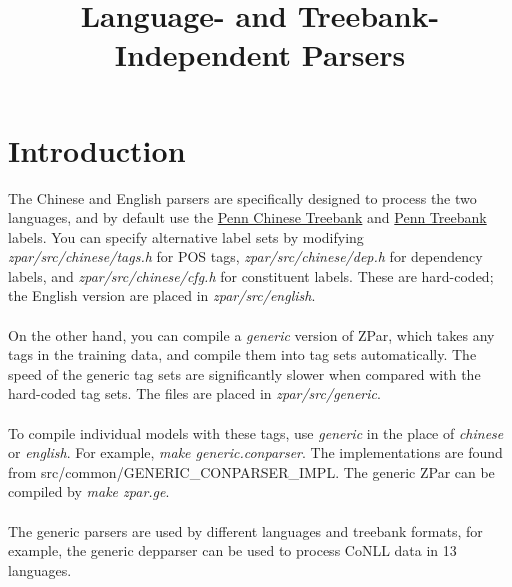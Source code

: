 \documentclass[12pt]{article}
\title{Language- and Treebank-Independent Parsers}
\begin{document}
\maketitle

\section{Introduction}
The Chinese and English parsers are specifically designed to process the two languages, and by default use the \href{http://www.cis.upenn.edu/~chinese/}{Penn Chinese Treebank} and \href{http://www.cis.upenn.edu/~treebank/}{Penn Treebank} labels. You can specify alternative label sets by modifying \textit{zpar/src/chinese/tags.h} for POS tags, \textit{zpar/src/chinese/dep.h} for dependency labels, and \textit{zpar/src/chinese/cfg.h} for constituent labels. These are hard-coded; the English version are placed in \textit{zpar/src/english}.
\\
\\
On the other hand, you can compile a \textit{generic} version of ZPar, which takes any tags in the training data, and compile them into tag sets automatically. The speed of the generic tag sets are significantly slower when compared with the hard-coded tag sets. The files are placed in \textit{zpar/src/generic}.
\\
\\
To compile individual models with these tags, use \textit{generic} in the place of \textit{chinese} or \textit{english}. For example, \textit{make generic.conparser}. The implementations are found from src/common/GENERIC\_CONPARSER\_IMPL. The generic ZPar can be compiled by \textit{make zpar.ge}. 
\\
\\
The generic parsers are used by different languages and treebank formats, for example, the generic depparser can be used to process CoNLL data in 13 languages.
\end{document}
